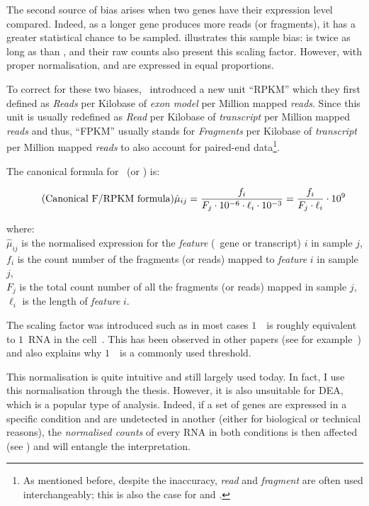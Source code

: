 The second source of bias arises when two genes have their expression level
compared. Indeed, as a longer gene produces more reads (or fragments), it has a
greater statistical chance to be sampled.  illustrates
this sample bias:  is twice as long as than , and their
raw counts also present this scaling factor. However, with proper normalisation,
 and  are expressed in equal proportions.\mybr\

To correct for these two biases,~\citet{Mortazavi2008} introduced a new unit
\enquote{RPKM} which they first defined as \emph{Reads} per
Kilobase of \emph{exon model} per Million mapped \emph{reads}.
Since this unit is usually redefined as \emph{Read} per
Kilobase of \emph{transcript} per Million mapped \emph{reads}
and thus, \enquote{FPKM} usually stands for  \emph{Fragments} per
Kilobase of \emph{transcript} per Million mapped \emph{reads}
to also account for paired-end data\footnote{As mentioned before,
despite the inaccuracy, \emph{read} and \emph{fragment} are often used
interchangeably; this is also the case for \emph{\RPKM} and \emph{\FPKM}.}.\mybr\

The canonical formula for \FPKM\ (or \RPKM) is:\mybr\

\begin{equation}
    \tag{Canonical F/RPKM formula}\label{eq:rpkm-fx}
\hat{\mu}_{ij}=\frac{f_i}{F_j\cdot10^{-6} \cdot \ell_i\cdot10^{-3}}
              =\frac{f_i}{F_j\cdot\ell_i}\cdot10^{9} \text{\,}
\end{equation}

where: \\{\small
$\hat{\mu}_{ij}$ is the normalised expression for the \emph{feature} (\eg\ gene or
transcript) $i$ in sample $j$,\\
$f_i$ is the count number of the fragments (or reads) mapped to
\emph{feature} $i$ in sample $j$,\\
$F_j$ is the total count number of all the fragments (or reads) mapped in
sample $j$,\\
$\ell_i$ is the length of \emph{feature} $i$.
}

The scaling factor was introduced such as in most cases $1$\ \FPKM\ is
roughly equivalent to $1$\ \gls{RNA} in the cell~. This
has been observed in other papers (see for example~\cite{Hebenstreit:2011}) and
also explains why $1$\ \FPKM\ is a commonly used threshold.%
\mybr\

This normalisation is quite intuitive and still largely used today.
In fact, I use this normalisation through the thesis.
However, it is also unsuitable for
\gls{DEA},
which is a popular type of analysis.
Indeed,
if a set of genes are expressed in a specific condition and are undetected in
another (either for biological or technical reasons), the \emph{normalised counts}
of every \gls{RNA} in both conditions is then affected (see )
and will entangle the interpretation.\mybr\


